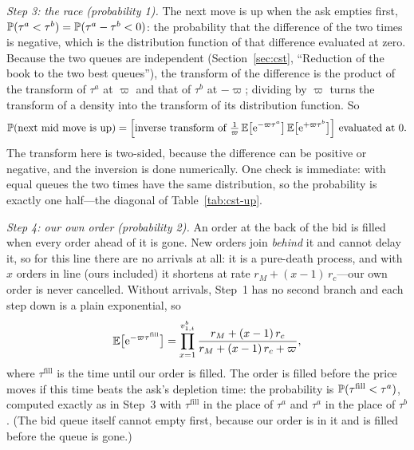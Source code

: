 \emph{Step 3: the race (probability 1).} The next move is up when the ask empties first,
$\P(\tau^a < \tau^b) = \P(\tau^a - \tau^b < 0)$: the probability that the difference of the two times is
negative, which is the distribution function of that difference evaluated at zero. Because the two queues
are independent (Section~\ref{sec:cst}, ``Reduction of the book to the two best queues''), the transform of the
difference is the product of the transform of $\tau^a$ at $\varpi$ and that of $\tau^b$ at $-\varpi$;
dividing by $\varpi$ turns the transform of a density into the transform of its distribution function.
So
\begin{equation}
  \P(\text{next mid move is up}) = \Big[\text{inverse transform of }
  \tfrac{1}{\varpi}\, \E\big[\mathrm{e}^{-\varpi \tau^a}\big]\,\E\big[\mathrm{e}^{+\varpi \tau^b}\big]\Big]
  \text{ evaluated at } 0 .
\end{equation}
 The transform here is
two-sided, because the difference can be positive or negative, and the inversion is done numerically. One
check is immediate: with equal queues the two times have the same distribution, so the probability is
exactly one half---the diagonal of Table~\ref{tab:cst-up}.

\emph{Step 4: our own order (probability 2).} An order at the back of the bid is filled when every order
ahead of it is gone. New orders join \emph{behind} it and cannot delay it, so for this line there are no
arrivals at all: it is a pure-death process, and with $x$ orders in line (ours included) it shortens at rate
$r_M + (x-1)\,r_c$---our own order is never cancelled. Without arrivals, Step~1 has no second branch and
each step down is a plain exponential, so
\[
  \E\big[\mathrm{e}^{-\varpi \tau^{\text{fill}}}\big] = \prod_{x=1}^{v^b_{1,t}} \frac{r_M + (x-1)\,r_c}{r_M + (x-1)\,r_c + \varpi},
\]
where $\tau^{\text{fill}}$ is the time until our order is filled.
The order is filled before the price moves
if this time beats the ask's depletion time: the probability is $\P(\tau^{\text{fill}} < \tau^a)$,
computed exactly as in Step~3 with $\tau^{\text{fill}}$ in the place of $\tau^a$ and $\tau^a$ in the
place of $\tau^b$. (The bid queue itself cannot empty first, because our order is in it and is filled
before the queue is gone.)

